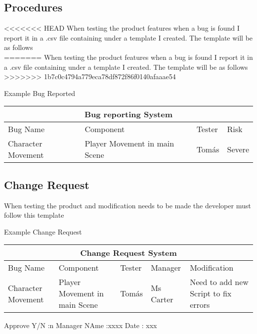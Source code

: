 \subsection{Procedures}


<<<<<<< HEAD
When testing the product features when a bug is found I report it in a  .csv file containing under a template I created. The template will be as follows\\
=======
When testing the product features when a bug is found I report it in a  .csv file containing under a template I created. The template will be as follows
>>>>>>> 1b7c0c4794a779eca78df872f86f0140afaaae54



\centerline{Example Bug Reported}
\centerline{}

\setlength{\arrayrulewidth}{1mm}
\setlength{\tabcolsep}{18pt}
\renewcommand{\arraystretch}{2.5}

\begin{tabular}{ |p{2.5cm}|p{2.5cm}|p{2.5cm}||p{2.5cm}|  }
\hline
\multicolumn{4}{|c|}{Bug reporting System } \\
\hline
Bug Name      & Component  & Tester & Risk \\
\hline
Character Movement   & Player Movement in main Scene & Tomás & Severe \\
\hline

\end{tabular}



\subsection{Change Request}


When testing the product and modification needs to be made the developer must follow this template



\centerline{Example Change Request}
\centerline{}

\setlength{\arrayrulewidth}{1mm}
\setlength{\tabcolsep}{18pt}
\renewcommand{\arraystretch}{1.5}

\begin{tabular}{ |p{1.5cm}|p{1.5cm}|p{1.5cm}||p{1.5cm}|p{1.5cm}|  }
\hline
\multicolumn{5}{|c|}{Change Request System } \\
\hline
Bug Name      & Component  & Tester & Manager & Modification \\
\hline
Character Movement   & Player Movement in main Scene & Tomás & Ms Carter & Need to add new Script to fix errors \\
\hline

\end{tabular}

\centerline{
}

\centerline{Approve Y/N :n Manager NAme :xxxx   Date : xxx
}


